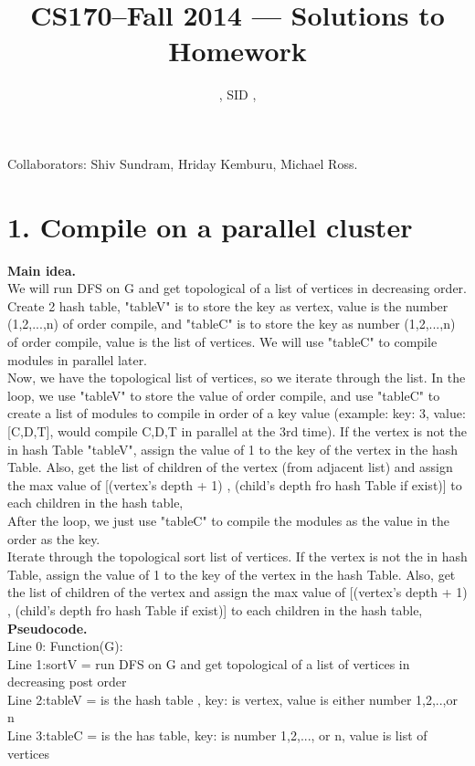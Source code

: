 \documentclass[11pt]{article}
\title{CS170--Fall 2014 --- Solutions to Homework \Homework}
\author{\Name, SID \SID, \texttt{\Login}}
\newcommand{\tab}{\hspace*{2em}}
\begin{document}
\maketitle

\noindent
Collaborators: Shiv Sundram, Hriday Kemburu, Michael Ross.


\section*{1. Compile on a parallel cluster}
\noindent
\textbf{Main idea.}\\
We will run DFS on G and get topological of a list of vertices in decreasing order. Create 2 hash table, "tableV" is to store the key as vertex, value is the number (1,2,...,n) of order compile, and "tableC"  is to store the key as number (1,2,...,n) of order compile, value is the list of vertices. We will use "tableC" to compile modules in parallel later.  \\
Now, we have the topological list of vertices, so we iterate through the list. In the loop, we use "tableV" to store the value of order compile, and use "tableC" to create a list of modules to compile in order of a key value (example: key: 3, value: [C,D,T], would compile C,D,T in parallel at the 3rd time). If the vertex is not the in hash Table "tableV", assign the value of 1 to the key of the vertex in the hash Table. Also, get the list of children of the vertex (from adjacent list) and assign the max value of [(vertex's depth + 1) , (child's depth fro hash Table if exist)]  to each children in the hash table, \\
After the loop, we just use "tableC" to compile the modules as the value in the order as the key.
\\
Iterate through the topological sort list of vertices. If the vertex is not the in hash Table, assign the value of 1 to the key of the vertex in the hash Table. Also, get the list of children of the vertex and assign the max value of [(vertex's depth + 1) , (child's depth fro hash Table if exist)]  to each children in the hash table, \\
\noindent
\textbf{Pseudocode.}\\
Line 0: Function(G):\\
Line 1:\tab sortV = run DFS on G and get topological of a list of vertices in decreasing post order\\
Line 2:\tab tableV = is the hash table , key: is vertex, value is either number 1,2,..,or n\\
Line 3:\tab tableC = is the has table, key: is number 1,2,..., or n, value is list of vertices\\   
\end{document}
